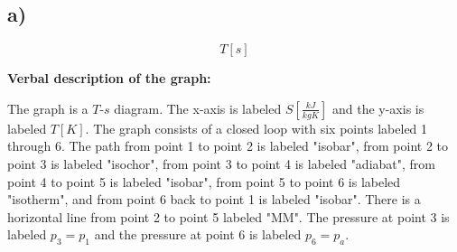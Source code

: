 

\subsection*{a)}

\[
T[s]
\]

\textbf{Verbal description of the graph:}

The graph is a $T$-$s$ diagram. The x-axis is labeled $S \left[\frac{kJ}{kgK}\right]$ and the y-axis is labeled $T[K]$. The graph consists of a closed loop with six points labeled 1 through 6. The path from point 1 to point 2 is labeled "isobar", from point 2 to point 3 is labeled "isochor", from point 3 to point 4 is labeled "adiabat", from point 4 to point 5 is labeled "isobar", from point 5 to point 6 is labeled "isotherm", and from point 6 back to point 1 is labeled "isobar". There is a horizontal line from point 2 to point 5 labeled "MM". The pressure at point 3 is labeled $p_3 = p_1$ and the pressure at point 6 is labeled $p_6 = p_a$.